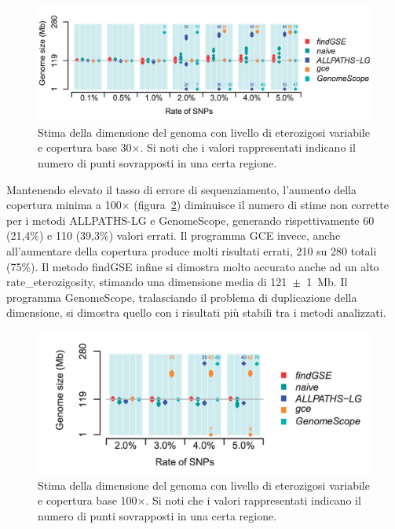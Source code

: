\documentclass[crop=false, class=book]{standalone}
\begin{document}
 	\begin{figure}
 		\centering
 		\includegraphics[height=0.21\textheight]{capitoli/analisi/confronto/confronto1/d.png}
 		\caption{Stima della dimensione del genoma con livello di eterozigosi variabile e copertura base 30$\times$. Si noti che i valori rappresentati indicano il numero di punti sovrapposti in una certa regione.}
 		\label{fig:confronto3}
 	\end{figure}
 
 	Mantenendo elevato il tasso di errore di sequenziamento, l'aumento della copertura minima a 100$\times$ (figura~\ref{fig:confronto4}) diminuisce il numero di stime non corrette per i metodi ALLPATHS-LG e GenomeScope, generando rispettivamente 60 (21,4\%) e 110 (39,3\%) valori errati. 
 	Il programma GCE invece, anche all'aumentare della copertura produce molti risultati errati, 210 su 280 totali (75\%).
 	Il metodo findGSE infine si dimostra molto accurato anche ad un alto \gls{rate_eterozigosity}, stimando una dimensione media di \mbox{121 $\pm$ 1 Mb}. 
 	Il programma GenomeScope, tralasciando il problema di duplicazione della dimensione, si dimostra quello con i risultati più stabili tra i  metodi analizzati.
 	
	 \begin{figure} 
	 	\centering
	 	\includegraphics[height=0.21\textheight]{capitoli/analisi/confronto/confronto1/e.png}
	 	\caption{Stima della dimensione del genoma con livello di eterozigosi variabile e copertura base 100$\times$. Si noti che i valori rappresentati indicano il numero di punti sovrapposti in una certa regione.}
	 	\label{fig:confronto4}
	 \end{figure}
 
\end{document}
